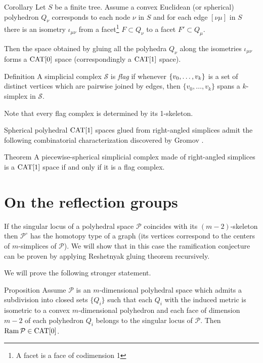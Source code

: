\documentclass[oneside,a4paper]{article}
\begin{document}
\begin{thm}{Corollary}\label{cor:resh}
Let $S$ be a finite tree.
Assume a convex Euclidean (or spherical) polyhedron $Q_\nu$
corresponds to each node $\nu$ in $S$
and for each edge $[\nu\mu]$ in $S$
there is an isometry $\iota_{\mu\nu}$
from a facet\footnote{A facet is a face of codimension 1} $F\subset Q_\nu$ to a facet $F'\subset Q_\mu$.

Then the space obtained by gluing all the polyhedra $Q_\nu$ along the isometries $\iota_{\mu\nu}$ forms a $\mathrm{CAT}[0]$ space (correspondingly a $\mathrm{CAT}[1]$ space).
\end{thm}


\begin{thm}{Definition}
A simplicial complex $\mathcal{S}$ is \emph{flag} if whenever $\{v_0,\z\dots,v_k\}$
is a set of distinct vertices which are pairwise joined by edges, then $\{v_0,\dots,v_k\}$
spans a $k$-simplex in $\mathcal{S}$.
\end{thm}

Note that every flag complex is determined by its 1-skeleton.

Spherical polyhedral $\mathrm{CAT}[1]$ spaces glued from right-angled simplices
admit the following combinatorial characterization discovered by Gromov \cite[p. 122]{gromov-hyp-group}.

\begin{thm}{Theorem}
 A piecewise-spherical simplicial complex made of right-angled simplices is a $\mathrm{CAT}[1]$ space if and only if it is a flag complex.
\end{thm}



\section{On the reflection groups}

If the singular locus of a polyhedral space $\mathcal{P}$ coincides with its $(m-2)$-skeleton
then $\mathcal{P}^\circ$ has the homotopy type of a graph 
(its vertices correspond to the centers of $m$-simplices of $\mathcal{P}$).
We will show that in this case the ramification conjecture can be proven by applying Reshetnyak gluing theorem recursively.

We will prove the following stronger statement.

\begin{thm}{Proposition}\label{prop:ramresh}
Assume $\mathcal{P}$ is an $m$-dimensional polyhedral space which
admits a subdivision into closed sets $\{Q_i\}$
such that each $Q_i$ with the induced metric is isometric to a convex $m$-dimensional polyhedron and each face  of dimension $m-2$ of each polyhedron $Q_i$ belongs to the singular locus of $\mathcal{P}$.
Then $\mathop{\rm Ram}\nolimits \mathcal{P}\in\mathrm{CAT}[0]$.
\end{thm}
\end{document}
